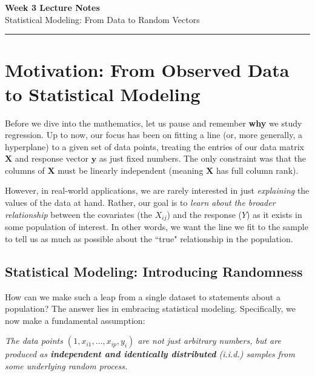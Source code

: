 \documentclass[12pt]{article}
\begin{document}
\begin{center}
  {\LARGE\bfseries Week 3 Lecture Notes}\\[2ex]
  {\large Statistical Modeling: From Data to Random Vectors}\\[1ex]
  \rule{\textwidth}{.5pt}
\end{center}




\section{Motivation: From Observed Data to Statistical Modeling}

Before we dive into the mathematics, let us pause and remember \textbf{why} we study regression. Up to now, our focus has been on fitting a line (or, more generally, a hyperplane) to a given set of data points, treating the entries of our data matrix $\boldsymbol{X}$ and response vector $\boldsymbol{y}$ as just fixed numbers. The only constraint was that the columns of $\boldsymbol{X}$ must be linearly independent (meaning $\boldsymbol{X}$ has full column rank).

However, in real-world applications, we are rarely interested in just \emph{explaining} the values of the data at hand. Rather, our goal is to \emph{learn about the broader relationship} between the covariates (the $X_{ij}$) and the response ($Y$) as it exists in some population of interest. In other words, we want the line we fit to the sample to tell us as much as possible about the ``true" relationship in the population.

\subsection*{Statistical Modeling: Introducing Randomness}

How can we make such a leap from a single dataset to statements about a population? The answer lies in embracing statistical modeling. Specifically, we now make a fundamental assumption:

\begin{center}
  \emph{The data points $\left(1, x_{i1}, \ldots, x_{ip}, y_i\right)$ are not just arbitrary numbers, but are produced as \textbf{independent and identically distributed} (i.i.d.) samples from some underlying random process.}
\end{center}
\end{document}
